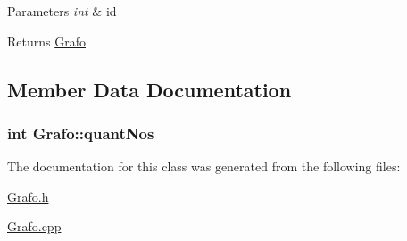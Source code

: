 \begin{DoxyParams}{Parameters}
{\em int} & id \\
\hline
\end{DoxyParams}
\begin{DoxyReturn}{Returns}
\hyperlink{class_grafo}{Grafo} 
\end{DoxyReturn}


\subsection{Member Data Documentation}
\hypertarget{class_grafo_a579e844e050120ab0cea14ca32e8735b}{
\subsubsection[{quant\-Nos}]{\setlength{\rightskip}{0pt plus 5cm}int Grafo\-::quant\-Nos}}\label{class_grafo_a579e844e050120ab0cea14ca32e8735b}


The documentation for this class was generated from the following files\-:\begin{DoxyCompactItemize}
\item 
\hyperlink{_grafo_8h}{Grafo.\-h}\item 
\hyperlink{_grafo_8cpp}{Grafo.\-cpp}\end{DoxyCompactItemize}
